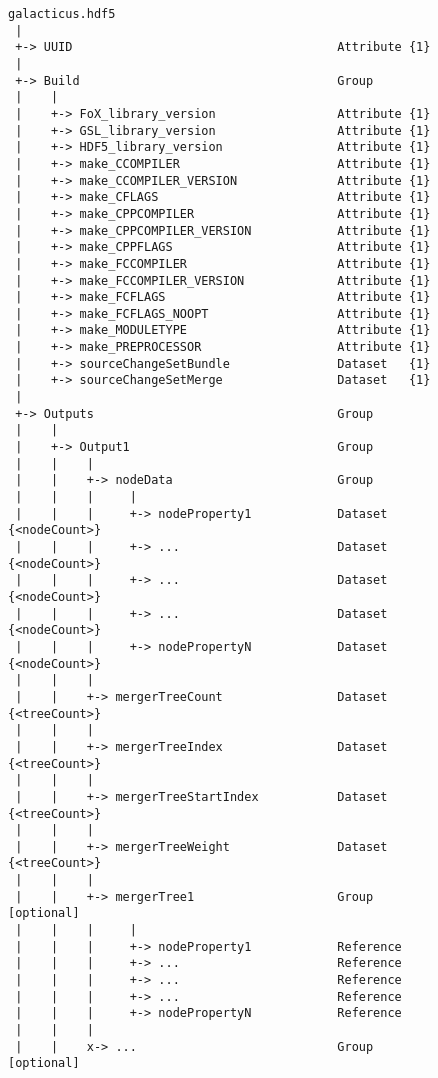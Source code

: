 \begin{figure}
\begin{center}
\begin{verbatim}
galacticus.hdf5
 |
 +-> UUID                                     Attribute {1}
 |
 +-> Build                                    Group
 |    |
 |    +-> FoX_library_version                 Attribute {1}
 |    +-> GSL_library_version                 Attribute {1}
 |    +-> HDF5_library_version                Attribute {1}
 |    +-> make_CCOMPILER                      Attribute {1}
 |    +-> make_CCOMPILER_VERSION              Attribute {1}
 |    +-> make_CFLAGS                         Attribute {1}
 |    +-> make_CPPCOMPILER                    Attribute {1}
 |    +-> make_CPPCOMPILER_VERSION            Attribute {1}
 |    +-> make_CPPFLAGS                       Attribute {1}
 |    +-> make_FCCOMPILER                     Attribute {1}
 |    +-> make_FCCOMPILER_VERSION             Attribute {1}
 |    +-> make_FCFLAGS                        Attribute {1}
 |    +-> make_FCFLAGS_NOOPT                  Attribute {1}
 |    +-> make_MODULETYPE                     Attribute {1}
 |    +-> make_PREPROCESSOR                   Attribute {1}
 |    +-> sourceChangeSetBundle               Dataset   {1}
 |    +-> sourceChangeSetMerge                Dataset   {1}
 |
 +-> Outputs                                  Group
 |    |
 |    +-> Output1                             Group
 |    |    |
 |    |    +-> nodeData                       Group
 |    |    |     |
 |    |    |     +-> nodeProperty1            Dataset {<nodeCount>}
 |    |    |     +-> ...                      Dataset {<nodeCount>}
 |    |    |     +-> ...                      Dataset {<nodeCount>}
 |    |    |     +-> ...                      Dataset {<nodeCount>}
 |    |    |     +-> nodePropertyN            Dataset {<nodeCount>}
 |    |    |
 |    |    +-> mergerTreeCount                Dataset {<treeCount>}
 |    |    |
 |    |    +-> mergerTreeIndex                Dataset {<treeCount>}
 |    |    |
 |    |    +-> mergerTreeStartIndex           Dataset {<treeCount>}
 |    |    |
 |    |    +-> mergerTreeWeight               Dataset {<treeCount>}
 |    |    |
 |    |    +-> mergerTree1                    Group              [optional]
 |    |    |     |
 |    |    |     +-> nodeProperty1            Reference
 |    |    |     +-> ...                      Reference
 |    |    |     +-> ...                      Reference
 |    |    |     +-> ...                      Reference
 |    |    |     +-> nodePropertyN            Reference
 |    |    |
 |    |    x-> ...                            Group              [optional]

\end{verbatim}
\end{center}
\end{figure}
